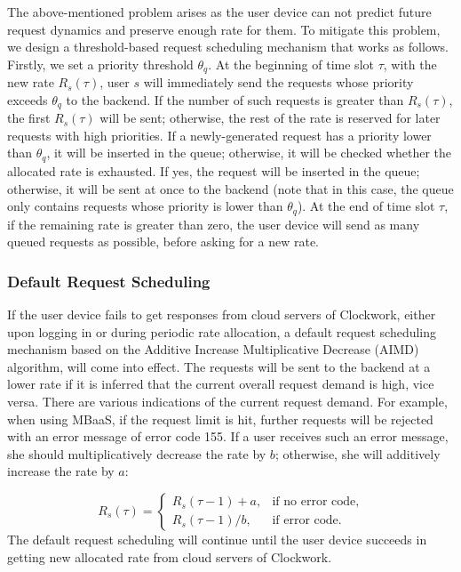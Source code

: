 The above-mentioned problem arises as the user device can not predict future request dynamics and preserve enough rate for them. To mitigate this problem, we design a threshold-based request scheduling mechanism that works as follows. Firstly, we set a priority threshold $\theta_q$. At the beginning of time slot $\tau$, with the new rate $R_s(\tau)$, user $s$ will immediately send the requests whose priority exceeds $\theta_q$ to the backend. If the number of such requests is greater than $R_s(\tau)$, the first $R_s(\tau)$ will be sent; otherwise, the rest of the rate is reserved for later requests with high priorities. If a newly-generated request has a priority lower than $\theta_q$, it will be inserted in the queue; otherwise, it will be checked whether the allocated rate is exhausted. If yes, the request will be inserted in the queue; otherwise, it will be sent at once to the backend (note that in this case, the queue only contains requests whose priority is lower than $\theta_q$). At the end of time slot $\tau$, if the remaining rate is greater than zero, the user device will send as many queued requests as possible, before asking for a new rate.

\subsubsection{Default Request Scheduling}\label{sec:default}

If the user device fails to get responses from cloud servers of Clockwork, either upon logging in or during periodic rate allocation, a default request scheduling mechanism based on the Additive Increase Multiplicative Decrease (AIMD) algorithm, will come into effect. The requests will be sent to the backend at a lower rate if it is inferred that the current overall request demand is high, vice versa. There are various indications of the current request demand. For example, when using MBaaS, if the request limit is hit, further requests will be rejected with an error message of error code 155. If a user receives such an error message, she should multiplicatively decrease the rate by $b$; otherwise, she will additively increase the rate by $a$: 

\begin{equation}\label{equ:default}
R_s(\tau)= \left\{
\begin{array}{ll}
R_s(\tau-1)+a, &\textrm{if no error code},\\
R_s(\tau-1)/b, &\textrm{if error code}.
\end{array}
\right.
\end{equation}
The default request scheduling will continue until the user device succeeds in getting new allocated rate from cloud servers of Clockwork.

